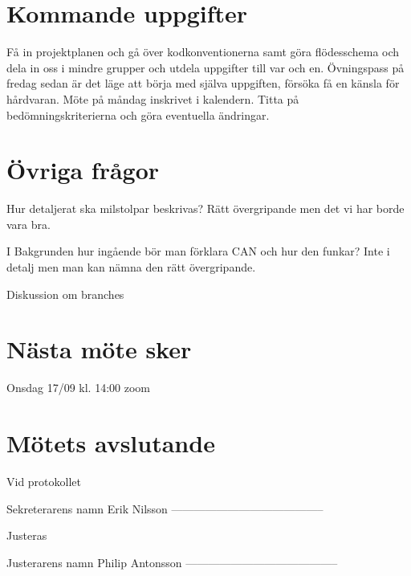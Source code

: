 \documentclass[a4paper]{article}
\begin{document}
\section{Kommande uppgifter}
\label{sec:komm}
Få in projektplanen och gå över kodkonventionerna samt göra flödesschema och dela in oss i mindre grupper och utdela uppgifter till var och en. Övningspass på fredag sedan är det läge att börja med själva uppgiften, försöka få en känsla för hårdvaran. 
Möte på måndag inskrivet i kalendern.
Titta på bedömningskriterierna och göra eventuella ändringar.



\section{Övriga frågor}
\label{sec:övr}
Hur detaljerat ska milstolpar beskrivas?
	Rätt övergripande men det vi har borde vara bra.


I Bakgrunden hur ingående bör man förklara CAN och hur den funkar?
	Inte i detalj men man kan nämna den rätt övergripande.

Diskussion om branches


\section{Nästa möte sker}
\label{sec:övr}
Onsdag 17/09 kl. 14:00 zoom


\section{Mötets avslutande}
\label{sec:övr}



Vid protokollet

Sekreterarens namn
Erik Nilsson
-----------------------------------------



Justeras


Justerarens namn
Philip Antonsson
-----------------------------------------
\end{document}
